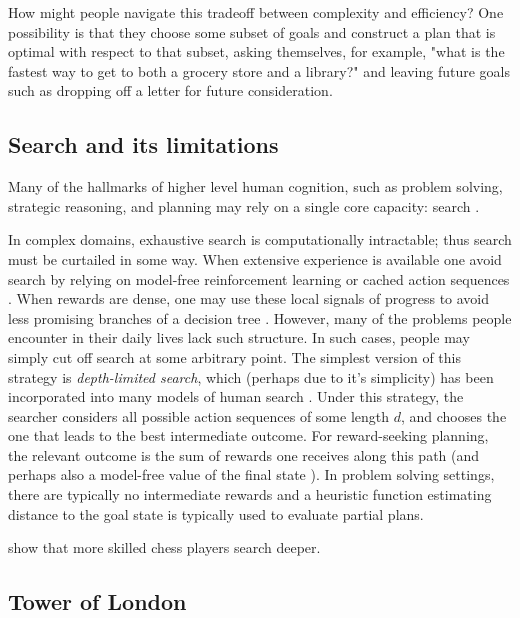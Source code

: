 \documentclass[10pt,letterpaper]{article}
\begin{document}
How might people navigate this tradeoff between complexity and efficiency? One possibility is that they choose some subset of goals and construct a plan that is optimal with respect to that subset, asking themselves, for example, "what is the fastest way to get to both a grocery store and a library?" and leaving future goals such as dropping off a letter for future consideration.



\subsection{Search and its limitations}

Many of the hallmarks of higher level human cognition, such as problem solving, strategic reasoning, and planning may rely on a single core capacity: search \cite{NewellSimon1972}.

In complex domains, exhaustive search is computationally intractable; thus search must be curtailed in some way. When extensive experience is available one avoid search by relying on model-free reinforcement learning \citep{Kool2017} or cached action sequences \citep{Huys2015}. When rewards are dense, one may use these local signals of progress to avoid less promising branches of a decision tree \citep{Huys2012}. However, many of the problems people encounter in their daily lives lack such structure. In such cases, people may simply cut off search at some arbitrary point. The simplest version of this strategy is \textit{depth-limited search}, which (perhaps due to it's simplicity) has been incorporated into many models of human search \citep{MacGregor2001,Keramati2016,Krusche2018}. Under this strategy, the searcher considers all possible action sequences of some length $d$, and chooses the one that leads to the best intermediate outcome. For reward-seeking planning, the relevant outcome is the sum of rewards one receives along this path (and perhaps also a model-free value of the final state \citep{Keramati2016}). In problem solving settings, there are typically no intermediate rewards and a heuristic function estimating distance to the goal state is typically used to evaluate partial plans.

\citet{Campitelli2004} show that more skilled chess players search deeper.


\subsection{Tower of London}
\end{document}
